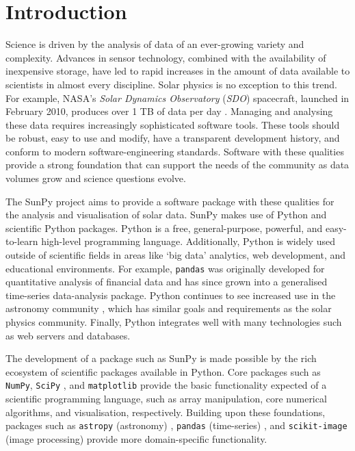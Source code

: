 \section{Introduction}\label{sec:Intro}

Science is driven by the analysis of data of an ever-growing variety and 
complexity. Advances in sensor technology, combined with the availability of 
inexpensive 
storage, have led to rapid increases in the amount of data available to scientists in almost
every discipline.  Solar physics is no exception to this trend. For example,
NASA's \textit{Solar Dynamics Observatory} (\textit{SDO}) spacecraft, launched
in February 2010, produces over 1 TB of data per day \citep{pesnell2012}. Managing and
analysing these data requires increasingly sophisticated software
tools. These tools should be robust, easy to use and modify, have a transparent
development history, and conform to modern software-engineering
standards. Software with these qualities provide a strong foundation that can support the
needs of the community as data volumes grow and science questions evolve.

The SunPy project aims to provide a software package with these qualities for 
the analysis and visualisation of solar data. SunPy makes
use of Python and scientific Python packages. Python is a free, general-purpose, 
powerful, and easy-to-learn high-level programming language. Additionally, Python is 
widely used outside of scientific fields in areas like `big data' analytics, web 
development, and educational environments. For example, \texttt{pandas} was 
originally developed for quantitative analysis of financial data and has since 
grown into a generalised time-series data-analysis package. Python continues to 
see increased use in the astronomy community \citep{greenfield2011}, which has 
similar goals and requirements as the solar physics community. Finally, Python 
integrates well with many technologies such as web servers \citep{dolgert2008} and databases. 

The development of a package such as SunPy is made possible by the rich ecosystem of 
scientific packages available in Python. Core packages such as \texttt{NumPy}, 
\texttt{SciPy} \citep{jones2001}, and \texttt{matplotlib} \citep{hunter2007} provide 
the basic functionality expected of a scientific programming language,
such as array manipulation, core numerical algorithms, and visualisation, respectively.
Building upon these foundations, packages such as \texttt{astropy} (astronomy)
\citep{theastropycollaboration2013}, \texttt{pandas} (time-series)
\citep{mckinney2010, mckinney2012}, and \texttt{scikit-image} (image processing)
\citep{vanderwalt2014} provide more domain-specific functionality.

